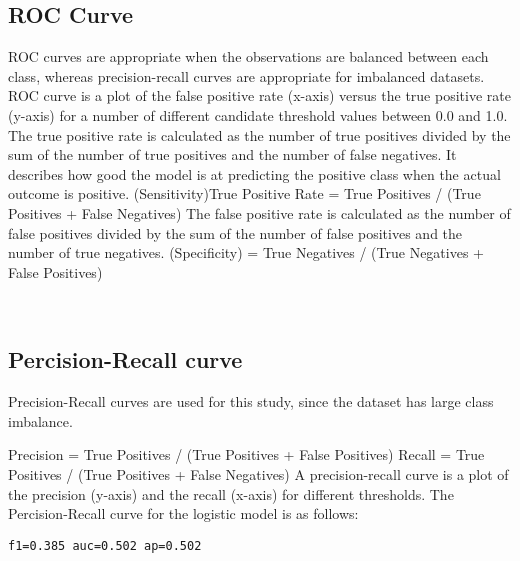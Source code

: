 \documentclass[11pt]{article}
\begin{document}
    \hypertarget{roc-curve}{%
\subsection{ROC Curve}\label{roc-curve}}

    ROC curves are appropriate when the observations are balanced between
each class, whereas precision-recall curves are appropriate for
imbalanced datasets. ROC curve is a plot of the false positive rate
(x-axis) versus the true positive rate (y-axis) for a number of
different candidate threshold values between 0.0 and 1.0. The true
positive rate is calculated as the number of true positives divided by
the sum of the number of true positives and the number of false
negatives. It describes how good the model is at predicting the positive
class when the actual outcome is positive. (Sensitivity)True Positive
Rate = True Positives / (True Positives + False Negatives) The false
positive rate is calculated as the number of false positives divided by
the sum of the number of false positives and the number of true
negatives. (Specificity) = True Negatives / (True Negatives + False
Positives)

    \begin{center}
    \end{center}
    { \hspace*{\fill} \\}
    
    \hypertarget{percision-recall-curve}{%
\subsection{Percision-Recall curve}\label{percision-recall-curve}}

    Precision-Recall curves are used for this study, since the dataset has
large class imbalance.

Precision = True Positives / (True Positives + False Positives) Recall =
True Positives / (True Positives + False Negatives) A precision-recall
curve is a plot of the precision (y-axis) and the recall (x-axis) for
different thresholds. The Percision-Recall curve for the logistic model
is as follows:

    \begin{Verbatim}[commandchars=\\\{\}]
f1=0.385 auc=0.502 ap=0.502

    \end{Verbatim}
\end{document}
